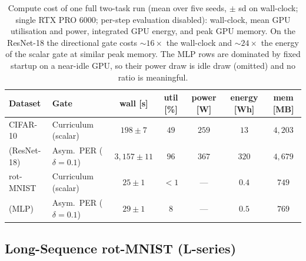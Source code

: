 \begin{table}[H]
    \centering
    \small
    \begin{tabular}{ll ccccc}
        \hline
        Dataset     & Gate                        & wall [s]         & util [\%] & power [W] & energy [Wh] & mem [MB]  \\
        \hline
        CIFAR-10    & Curriculum (scalar)         & $198 \pm 7$      & $49$      & $259$     & $13$        & $4{,}203$ \\
        (ResNet-18) & Asym.\ PER ($\delta{=}0.1$) & $3{,}157 \pm 11$ & $96$      & $367$     & $320$       & $4{,}679$ \\
        \hline
        rot-MNIST   & Curriculum (scalar)         & $25 \pm 1$       & $<\!1$    & ---       & $0.4$       & $749$     \\
        (MLP)       & Asym.\ PER ($\delta{=}0.1$) & $29 \pm 1$       & $8$       & ---       & $0.5$       & $769$     \\
        \hline
    \end{tabular}
    \caption{Compute cost of one full two-task run (mean over five seeds, $\pm$ sd on wall-clock; single RTX PRO 6000; per-step evaluation disabled): wall-clock, mean GPU utilisation and power, integrated GPU energy, and peak GPU memory. On the ResNet-18 the directional gate costs ${\sim}16\times$ the wall-clock and ${\sim}24\times$ the energy of the scalar gate at similar peak memory. The MLP rows are dominated by fixed startup on a near-idle GPU, so their power draw is idle draw (omitted) and no ratio is meaningful.}
    \label{tab:res_cost}
\end{table}

\subsection{Long-Sequence rot-MNIST (L-series)}
\label{app:longseq_full}

